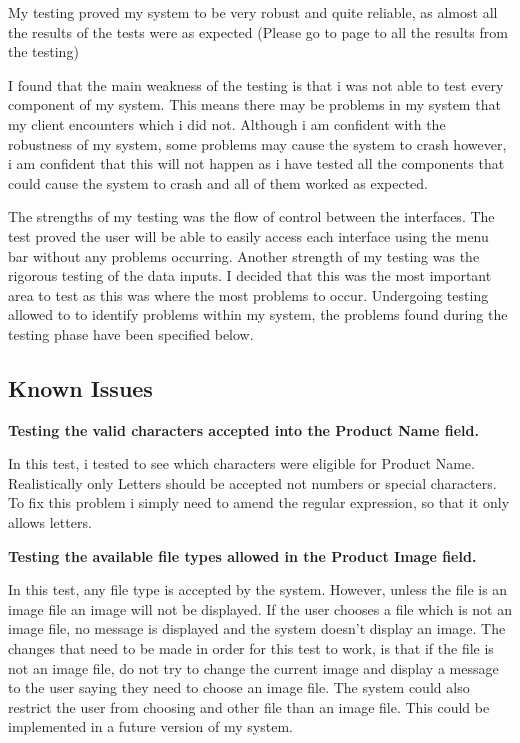 My testing proved my system to be very robust and quite reliable, as almost all the results of the tests were as expected (Please go to page \pageref{fig:actual-results} to all the results from the testing)

I found that the main weakness of the testing is that i was not able to test every component of my system. This means there may be problems in my system that my client encounters which i did not. Although i am confident with the robustness of my system, some problems may cause the system to crash however, i am confident that this will not happen as i have tested all the components that could cause the system to crash and all of them worked as expected.

The strengths of my testing was the flow of control between the interfaces. The test proved the user will be able to easily access each interface using the menu bar without any problems occurring. Another strength of my testing was the rigorous testing of the data inputs. I decided that this was the most important area to test as this was where the most problems to occur. Undergoing testing allowed to to identify problems within my system, the problems found during the testing phase have been specified below.

\subsection{Known Issues}

\textbf{Testing the valid characters accepted into the Product Name field.}

In this test, i tested to see which characters were eligible for Product Name. Realistically only Letters should be accepted not numbers or special characters. To fix this problem i simply need to amend the regular expression, so that it only allows letters. 


\textbf{Testing the available file types allowed in the Product Image field.}

In this test, any file type is accepted by the system. However, unless the file is an image file an image will not be displayed. If the user chooses a file which is not an image file, no message is displayed and the system doesn't display an image. The changes that need to be made in order for this test to work, is that if the file is not an image file, do not try to change the current image and display a message to the user saying they need to choose an image file. The system could also restrict the user from choosing and other file than an image file. This could be implemented in a future version of my system.

